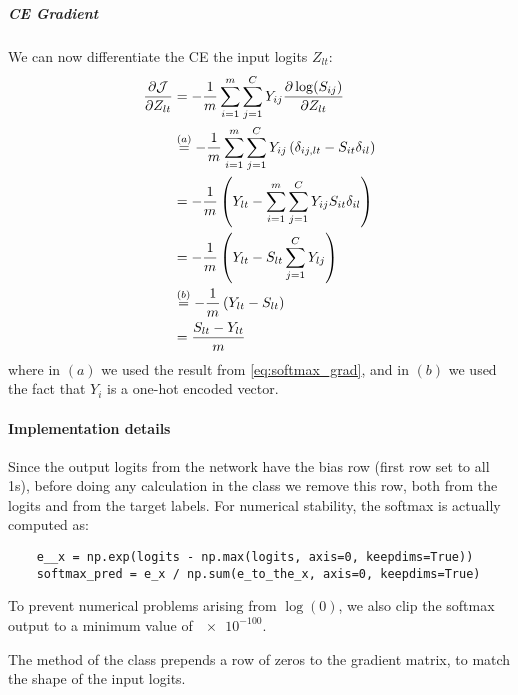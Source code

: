 \subparagraph{\ac{CE} Gradient} We can now differentiate the \ac{CE} \wrt the input logits $Z_{lt}$:
\begin{equation}
\begin{split}
    \pdv{\mathcal{J}}{Z_{lt}} &= -\frac{1}{m} \sum_{i=1}^{m} \sum_{j=1}^{C} Y_{ij} \pdv{\log(S_{ij})}{Z_{lt}}\\
    &\overset{(a)}{=} -\frac{1}{m} \sum_{i=1}^{m} \sum_{j=1}^{C} Y_{ij} \left(\delta_{ij,lt} - S_{it} \delta_{il} \right)\\
    &= -\frac{1}{m} \left( Y_{lt} - \sum_{i=1}^{m} \sum_{j=1}^{C} Y_{ij} S_{it} \delta_{il} \right)\\
    &= -\frac{1}{m} \left( Y_{lt} - S_{lt} \sum_{j=1}^{C} Y_{lj} \right)\\
    &\overset{(b)}{=} -\frac{1}{m} \left( Y_{lt} - S_{lt} \right)\\
    &= \frac{S_{lt} - Y_{lt}}{m}
\end{split}
\end{equation}
where in $(a)$ we used the result from \cref{eq:softmax_grad}, and in $(b)$ we used the fact that $Y_i$ is a one-hot encoded vector.

\paragraph{Implementation details} Since the output logits from the network have the bias row (first row set to all 1s), before doing any calculation in the  class we remove this row, both from the logits and from the target labels. For numerical stability, the softmax is actually computed as:
\begin{verbatim}
    e__x = np.exp(logits - np.max(logits, axis=0, keepdims=True))
    softmax_pred = e_x / np.sum(e_to_the_x, axis=0, keepdims=True)
\end{verbatim}

To prevent numerical problems arising from $\log(0)$, we also clip the softmax output to a minimum value of $\num{e-100}$.

The  method of the  class prepends a row of zeros to the gradient matrix, to match the shape of the input logits.
